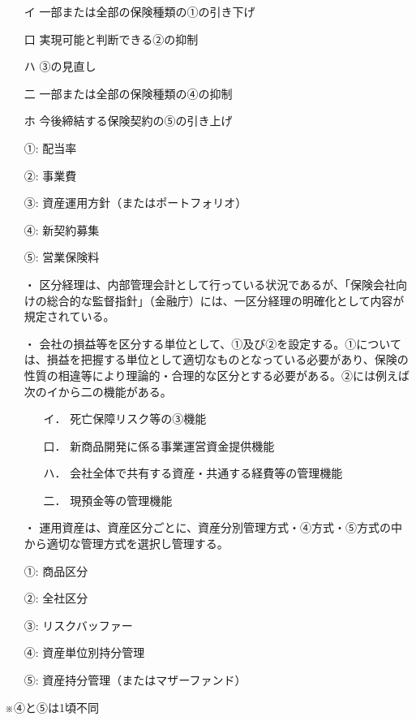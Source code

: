\documentclass[report,gutter=10mm,fore-edge=10mm,uplatex,dvipdfmx]{jlreq}
\begin{document}
\begin{itemize}
\item[ イ] 一部または全部の保険種類の①の引き下げ
\item[ 口] 実現可能と判断できる②の抑制
\item[ ハ] ③の見直し
\item[ 二] 一部または全部の保険種類の④の抑制
\item[ ホ] 今後締結する保険契約の⑤の引き上げ
\end{itemize}

\answer{}
\begin{itemize}
\item[①:] 配当率
\item[②:] 事業費
\item[③:] 資産運用方針（またはポートフォリオ）
\item[④:] 新契約募集
\item[⑤:] 営業保険料
\end{itemize}

\begin{itemize}
\item[・] 区分経理は、内部管理会計として行っている状況であるが、「保険会社向けの総合的な監督指針」（金融庁）には、一区分経理の明確化として内容が規定されている。
\item[・] 会社の損益等を区分する単位として、①及び②を設定する。①については、損益を把握する単位として適切なものとなっている必要があり、保険の性質の相違等により理論的・合理的な区分とする必要がある。②には例えば次のイから二の機能がある。
\begin{itemize}
\item[イ．] 死亡保障リスク等の③機能
\item[口．] 新商品開発に係る事業運営資金提供機能
\item[ハ．] 会社全体で共有する資産・共通する経費等の管理機能
\item[二．] 現預金等の管理機能
\end{itemize}
\item[・]運用資産は、資産区分ごとに、資産分別管理方式・④方式・⑤方式の中から適切な管理方式を選択し管理する。
\end{itemize}

\answer{}
\begin{itemize}
\item[①:] 商品区分
\item[②:] 全社区分
\item[③:] リスクバッファー
\item[④:] 資産単位別持分管理
\item[⑤:] 資産持分管理（またはマザーファンド）
\end{itemize}
※④と⑤は1頃不同
\end{document}
